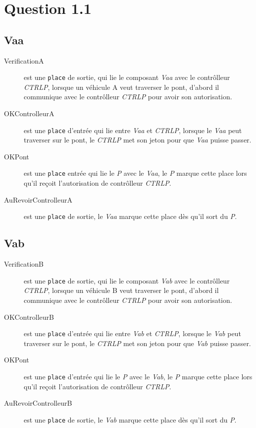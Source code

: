 \documentclass[a4paper,11pt]{report}
\begin{document}
\section{Question 1.1}
\subsection{Vaa}
	\begin{description}
		\item[VerificationA] est une \texttt{place} de sortie, qui lie le composant \textit{Vaa} avec le contrôlleur \textit{CTRLP}, lorsque un véhicule A veut traverser le pont, d'abord il communique avec le contrôlleur \textit{CTRLP} pour avoir son autorisation.
		\item[OKControlleurA] est une \texttt{place} d'entrée qui lie entre \textit{Vaa} et \textit{CTRLP}, lorsque le \textit{Vaa} peut traverser sur le pont, le \textit{CTRLP} met son jeton pour que \textit{Vaa} puisse passer.
		\item[OKPont] est une \texttt{place} entrée qui lie le \textit{P} avec le \textit{Vaa}, le \textit{P} marque cette place lors qu'il reçoit l'autorisation de contrôlleur \textit{CTRLP}.
		\item[AuRevoirControlleurA] est une \texttt{place} de sortie, le \textit{Vaa} marque cette place dès qu'il sort du \textit{P}.
	\end{description}	
	
	\subsection{Vab}
	\begin{description}
		\item[VerificationB] est une \texttt{place} de sortie, qui lie le composant \textit{Vab} avec le contrôlleur \textit{CTRLP}, lorsque un véhicule B veut traverser le pont, d'abord il communique avec le contrôlleur \textit{CTRLP} pour avoir son autorisation.
		\item[OKControlleurB] est une \texttt{place} d'entrée qui lie entre \textit{Vab} et \textit{CTRLP}, lorsque le \textit{Vab} peut traverser sur le pont, le \textit{CTRLP} met son jeton pour que \textit{Vab} puisse passer.
		\item[OKPont] est une \texttt{place} d'entrée qui lie le \textit{P} avec le \textit{Vab}, le \textit{P} marque cette place lors qu'il reçoit l'autorisation de contrôlleur \textit{CTRLP}.
		\item[AuRevoirControlleurB] est une \texttt{place} de sortie, le \textit{Vab} marque cette place dès qu'il sort du \textit{P}.
	\end{description}	
	
\end{document}
